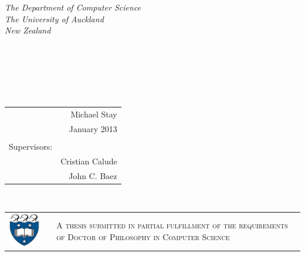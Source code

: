 \documentclass[12pt,twoside,openright]{report}
\begin{document}
  \thispagestyle{empty}
  \begin{center}
    {\em The Department of Computer Science \\ The University of Auckland \\ New Zealand \\[240pt]}
    \\
    \\~\\
    \\
  \end{center}
  {\hfill \em \fontsize{16}{16}\selectfont
    \begin{tabular}{rr}
      & Michael Stay \\
      & January 2013 \\ & \\
      Supervisors: & \\
      & Cristian Calude\\
      & John C. Baez \\
    \end{tabular}
  }\\
  \begin{tabular}{cp{50pt}p{300pt}}
    \includegraphics[width=75pt]{shield.eps} & &
    \vspace{-50pt} \textsc{\fontsize{16}{16}\selectfont A thesis submitted in partial fulfillment of the requirements of Doctor of Philosophy in Computer Science}
  \end{tabular}\\
  \pagebreak
  
\renewcommand{\thepage}{\roman{page}}
\end{document}
